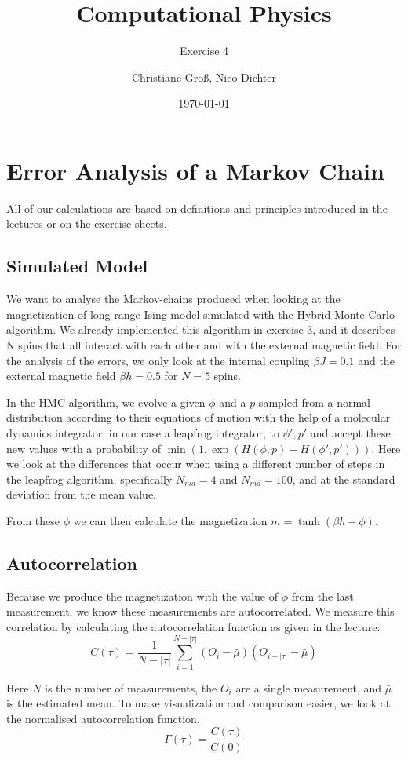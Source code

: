 \documentclass{scrartcl}
\title{Computational Physics}
\subtitle{Exercise 4}
\date{\today}
\author{Christiane Groß, Nico Dichter}
\begin{document}
	\maketitle
\section{Error Analysis of a Markov Chain}
All of our calculations are based on definitions and principles introduced in the lectures or on the exercise sheets.
\subsection{Simulated Model}
We want to analyse the Markov-chains produced when looking at the magnetization of long-range Ising-model simulated with the Hybrid Monte Carlo algorithm. We already implemented this algorithm in exercise 3, and it describes N spins that all interact with each other and with the external magnetic field. For the analysis of the errors, we only look at the internal coupling $\beta J=0.1$ and the external magnetic field $\beta h=0.5$ for $N=5$ spins. 
 
In the HMC algorithm, we evolve a given $\phi$ and a $p$ sampled from a normal distribution according to their equations of motion with the help of a molecular dynamics integrator, in our case a leapfrog integrator, to $\phi', p'$ and accept these new values with a probability of $\min(1, \exp(H(\phi, p)-H(\phi', p')))$. Here we look at the differences that occur when using a different number of steps in the leapfrog algorithm, specifically $N_{md}=4$ and $N_{md}=100$, and at the standard deviation from the mean value.

From these $\phi$ we can then calculate the magnetization $m=\tanh(\beta h+\phi)$.

\subsection{Autocorrelation}

Because we produce the magnetization with the value of $\phi$ from the last measurement, we know these measurements are autocorrelated. We measure this correlation by calculating the autocorrelation function as given in the lecture:
\[
C(\tau)=\frac{1}{N-|\tau|}\sum_{i=1}^{N-|\tau|}(O_i-\bar{\mu})(O_{i+|\tau|}-\bar{\mu})\]

Here $N$ is the number of measurements, the $O_i$ are a single measurement, and $\bar{\mu}$ is the estimated mean. To make visualization and comparison easier, we look at the normalised autocorrelation function, \[
\Gamma(\tau)=\frac{C(\tau)}{C(0)}
\]
\end{document}
